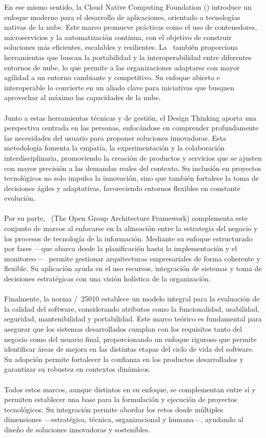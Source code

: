 En ese mismo sentido, la Cloud Native Computing Foundation (\CNCF) introduce un enfoque moderno para el desarrollo de aplicaciones, orientado a tecnologías nativas de la nube. Este marco promueve prácticas como el uso de contenedores, microservicios y la automatización continua, con el objetivo de construir soluciones más eficientes, escalables y resilientes\citep{CNCF2023}. La \CNCF\ también proporciona herramientas que buscan la portabilidad y la interoperabilidad entre diferentes entornos de nube, lo que permite a las organizaciones adaptarse con mayor agilidad a un entorno cambiante y competitivo. Su enfoque abierto e interoperable lo convierte en un aliado clave para iniciativas que busquen aprovechar al máximo las capacidades de la nube.\\ \\
Junto a estas herramientas técnicas y de gestión, el Design Thinking aporta una perspectiva centrada en las personas, enfocándose en comprender profundamente las necesidades del usuario para proponer soluciones innovadoras\citep{CombellesC.LucenaP.2020}. Esta metodología fomenta la empatía, la experimentación y la colaboración interdisciplinaria, promoviendo la creación de productos y servicios que se ajusten con mayor precisión a las demandas reales del contexto. Su inclusión en proyectos tecnológicos no solo impulsa la innovación, sino que también fortalece la toma de decisiones ágiles y adaptativas, favoreciendo entornos flexibles en constante evolución.\\ \\
Por su parte, \TOGAF\ (The Open Group Architecture Framework) complementa este conjunto de marcos al enfocarse en la alineación entre la estrategia del negocio y los procesos de tecnología de la información. Mediante su enfoque estructurado por fases —que abarca desde la planificación hasta la implementación y el monitoreo— \TOGAF\ permite gestionar arquitecturas empresariales de forma coherente y flexible. Su aplicación ayuda en el uso recursos, integración de sistemas y toma de decisiones estratégicas con una visión holística de la organización\citep{Mumtaza2025}.\\ \\
Finalmente, la norma \ISO/\IEC\ 25010 establece un modelo integral para la evaluación de la calidad del software, considerando atributos como la funcionalidad, usabilidad, seguridad, mantenibilidad y portabilidad\citep{ISO25010}. Este marco teórico es fundamental para asegurar que los sistemas desarrollados cumplan con los requisitos tanto del negocio como del usuario final, proporcionando un enfoque riguroso que permite identificar áreas de mejora en las distintas etapas del ciclo de vida del software. Su adopción permite fortalecer la confianza en los productos desarrollados y garantizar su robustez en contextos dinámicos.\\ \\
Todos estos marcos, aunque distintos en su enfoque, se complementan entre sí y permiten establecer una base para la formulación y ejecución de proyectos tecnológicos. Su integración permite abordar los retos desde múltiples dimensiones —estratégica, técnica, organizacional y humana—, ayudando al diseño de soluciones innovadoras y sostenibles.